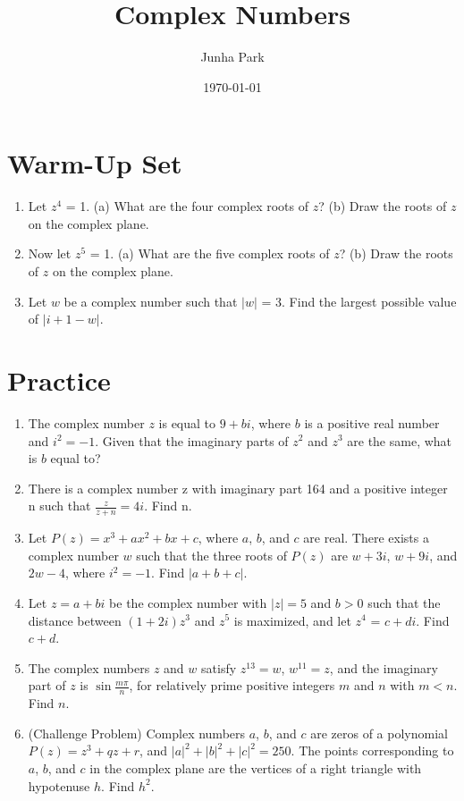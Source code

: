 \documentclass[a4paper]{article}
\title{Complex Numbers}
\author{Junha Park}
\date{\today}
\begin{document}
\maketitle

\section{Warm-Up Set}

\begin{enumerate}
\item Let $z^4$ = 1.
	(a) What are the four complex roots of $z$?
    (b) Draw the roots of $z$ on the complex plane.
\item Now let $z^5$ = 1.
	(a) What are the five complex roots of $z$?
    (b) Draw the roots of $z$ on the complex plane.
\item Let $w$ be a complex number such that $|w|$ = 3. Find the largest possible value of $|i + 1 - w|$.
\end{enumerate}

\section{Practice}
\begin{enumerate}
\item The complex number $z$ is equal to $9+bi$, where $b$ is a positive real number and $i^{2}=-1$. Given that the imaginary parts of $z^{2}$ and $z^{3}$ are the same, what is $b$ equal to?
\item There is a complex number z with imaginary part 164 and a positive integer n such that
$\frac {z}{z + n} = 4i$.
Find n.
\item Let $P(z)=x^3+ax^2+bx+c$, where $a$, $b$, and $c$ are real. There exists a complex number $w$ such that the three roots of $P(z)$ are $w+3i$, $w+9i$, and $2w-4$, where $i^2=-1$. Find $|a+b+c|$.
\item Let $z=a+bi$ be the complex number with $\vert z \vert = 5$ and $b > 0$ such that the distance between $(1+2i)z^3$ and $z^5$ is maximized, and let $z^4$ = $c+di$. Find $c+d$.
\item The complex numbers $z$ and $w$ satisfy $z^{13} = w$, $w^{11} = z$, and the imaginary part of $z$ is $\sin{\frac{m\pi}{n}}$, for relatively prime positive integers $m$ and $n$ with $m<n$. Find $n$.
\item (Challenge Problem) Complex numbers $a$, $b$, and $c$ are zeros of a polynomial $P(z) = z^3 + qz + r$, and $|a|^2 + |b|^2 + |c|^2 = 250$. The points corresponding to $a$, $b$, and $c$ in the complex plane are the vertices of a right triangle with hypotenuse $h$. Find $h^2$.
\end{enumerate}
\end{document}
